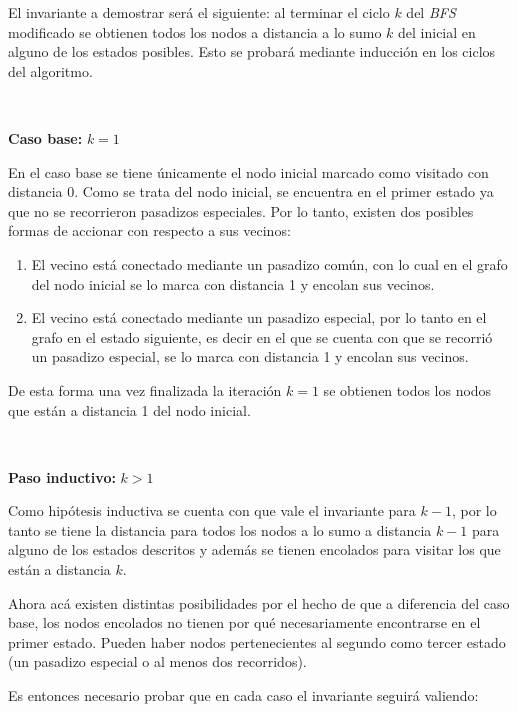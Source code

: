 	El invariante a demostrar será el siguiente: al terminar el ciclo $k$ del
	\emph{BFS} modificado se obtienen todos los nodos a distancia a lo sumo
	$k$ del inicial en alguno de los estados posibles. Esto se probará
	mediante inducción en los ciclos del algoritmo.

	~

	\textbf{Caso base: } $k = 1$

	En el caso base se tiene únicamente el nodo inicial marcado como
	visitado con distancia 0. Como se trata del nodo inicial, se encuentra en el primer estado ya que
	no se recorrieron pasadizos especiales. Por lo tanto, existen dos posibles
	formas de accionar con respecto a sus vecinos:

	\begin{enumerate}
		\item{
			El vecino está conectado mediante un pasadizo común, con lo cual en
			el grafo del nodo inicial se lo marca con distancia 1 y encolan sus
			vecinos.
		}
		\item{
			El vecino está conectado mediante un pasadizo especial, por lo tanto
			en el grafo en el estado siguiente, es decir en el que se cuenta con
			que se recorrió un pasadizo especial, se lo marca con distancia 1 y
			encolan sus vecinos.
		}
	\end{enumerate}

	De esta forma una vez finalizada la iteración $k = 1$ se obtienen todos los
	nodos que están a distancia 1 del nodo inicial.

	~

	\textbf{Paso inductivo: } $k > 1$

	Como hipótesis inductiva se cuenta con que vale el invariante para $k - 1$,
	por lo tanto se tiene la distancia para todos los nodos a lo sumo
	a distancia $k - 1$ para alguno de los estados descritos y además se
	tienen encolados para visitar los que están a distancia $k$.

	Ahora acá existen distintas posibilidades por el hecho de que a diferencia
	del caso base, los nodos encolados no tienen por qué necesariamente
	encontrarse en el primer estado. Pueden haber nodos pertenecientes al
	segundo como tercer estado (un pasadizo especial o al menos dos recorridos).

	Es entonces necesario probar que en cada caso el invariante seguirá
	valiendo:

